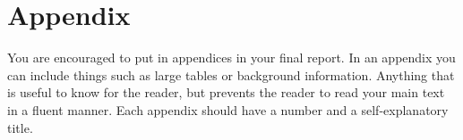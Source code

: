 \chapter*{Appendix}\label{appendix}


You are encouraged to put in appendices in your final report. In an appendix you can include things such as large tables or background information. Anything that is useful to know for the reader, but prevents the reader to read your main text in a fluent manner. Each appendix should have a number and a self-explanatory title. 